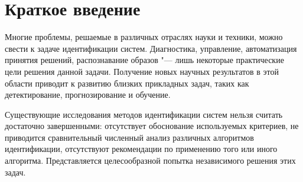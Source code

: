 \section{Краткое введение}

Многие проблемы, решаемые в различных отраслях науки и техники,
можно свести к задаче идентификации систем.
Диагностика, управление, автоматизация принятия решений, распознавание образов
"--- лишь некоторые практические цели решения данной задачи.
Получение новых научных результатов в этой области приводит к
развитию близких прикладных задач,
таких как детектирование, прогнозирование и обучение.

Существующие исследования методов идентификации систем нельзя считать
достаточно завершенными: отсутствует обоснование используемых критериев,
не приводится сравнительный численный анализ различных алгоритмов идентификации,
отсутствуют рекомендации по применению того или иного алгоритма.
Представляется целесообразной попытка независимого решения этих задач.

